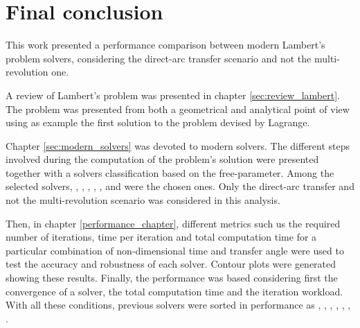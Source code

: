 \section{Final conclusion}

This work presented a performance comparison between modern Lambert's problem
solvers, considering the direct-arc transfer scenario and not the
multi-revolution one.

A review of Lambert's problem was presented in chapter \ref{sec:review_lambert}.
The problem was presented from both a geometrical and analytical point of view
using as example the first solution to the problem devised by Lagrange.

Chapter \ref{sec:modern_solvers} was devoted to modern solvers. The different
steps involved during the computation of the problem's solution were presented
together with a solvers classification based on the free-parameter. Among the
selected solvers,  \cite{gauss1809}, \cite{battin1984}, \cite{gooding1990},
\cite{avanzini2008}, \cite{arora2013}, \cite{vallado2013} and \cite{izzo2015}
were the chosen ones. Only the direct-arc transfer and not the multi-revolution
scenario was considered in this analysis.

Then, in chapter \ref{performance_chapter}, different metrics such us the
required number of iterations, time per iteration and total computation time for
a particular combination of non-dimensional time and transfer angle were used to
test the accuracy and robustness of each solver. Contour plots were generated
showing these results. Finally, the performance was based considering first the
convergence of a solver, the total computation time and the iteration workload.
With all these conditions, previous solvers were sorted in performance as
\cite{izzo2015}, \cite{arora2013}, \cite{gooding1990}, \cite{battin1984},
\cite{avanzini2008}, \cite{vallado2013}, \cite{gauss1809}.


